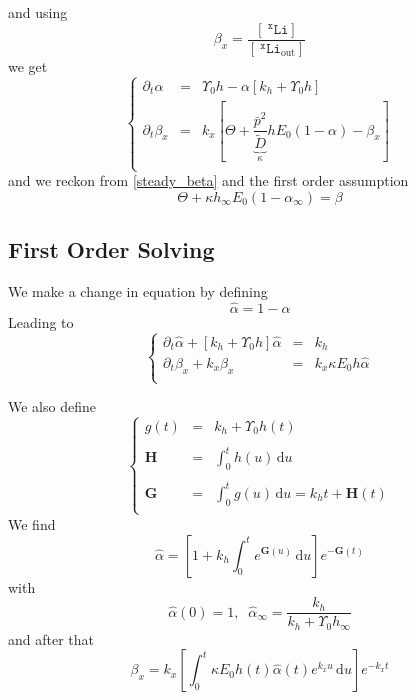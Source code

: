 \documentclass[aps,onecolumn,12pt]{revtex4}
\newcommand{\mychem}[1]{\mathtt{#1}}
\newcommand{\myconc}[1]{\left\lbrack{#1}\right\rbrack}
\newcommand{\spLi}[1]{{~^{\mychem{#1}}\mychem{Li}}}
\newcommand{\Li}[1]{\myconc{\spLi{#1}}}
\newcommand{\spLiOut}[1]{{\spLi{#1}}_{\mathrm{out}}}
\newcommand{\LiOut}[1]{\myconc{\spLiOut{#1}}}
\newcommand{\ih}{\ensuremath{\mathbf{H}}}
\newcommand{\ig}{\ensuremath{\mathbf{G}}}
\begin{document}
and using 
\begin{equation}
	\beta_x = \dfrac{\Li{x}}{\LiOut{x}}
\end{equation}
we get
\begin{equation}
\left\lbrace
\begin{array}{rcl}
\partial_t \alpha & = & \Upsilon_0 h - \alpha\left\lbrack k_h+\Upsilon_0 h  \right\rbrack\\
\partial_t\beta_x & = & k_x \left\lbrack
{\Theta + \underbrace{\dfrac{\bar{p}^2}{\tilde{D}}}_{\kappa} h E_0  \left(1-\alpha\right)}
- \beta_x
\right\rbrack \\
\end{array}
\right.
\end{equation}
and we reckon from \eqref{steady_beta} and the first order assumption
\begin{equation}
	\Theta + \kappa h_\infty E_0  \left(1-\alpha_\infty\right) = \beta 
\end{equation}

\subsection{First Order Solving}

We make a change in equation by defining
\begin{equation}
	\hat{\alpha} = 1-\alpha
\end{equation}
Leading to
\begin{equation}
\displaystyle
\left\lbrace
\begin{array}{rcl}
\partial_t \hat\alpha + \left\lbrack k_h+\Upsilon_0 h  \right\rbrack \hat{\alpha} & = & k_h\\
\partial_t \beta_x + k_x \beta_x & = & k_x \kappa E_0 h \hat\alpha \\
\end{array}
\right.
\end{equation}

We also define
\begin{equation}
\left\lbrace
\begin{array}{rcl}
g(t) & = & k_h + \Upsilon_0 h(t) \\
\\
\ih  & = & \displaystyle \int_0^t h(u) \, \mathrm{d}u\\
\\
\ig  & = &  \displaystyle \int_0^t g(u) \, \mathrm{d}u = k_h t + \ih(t)\\
\end{array}
\right.
\end{equation}
We find
\begin{equation}
	\hat\alpha = \left[ 1 + k_h \int_0^t e^{\ig(u)}\,\mathrm{d}u \right] e^{-\ig(t)}
\end{equation}
with
\begin{equation}
	\hat\alpha(0) = 1,\;\;\hat\alpha_\infty = \dfrac{k_h}{k_h+\Upsilon_0 h_\infty}
\end{equation}
and after that
\begin{equation}
\beta_x = k_x\left[\int_0^t \kappa E_0 h(t) \hat\alpha(t) e^{k_xu} \, \mathrm{d}u\right] e^{-k_xt}
\end{equation}
\end{document}
